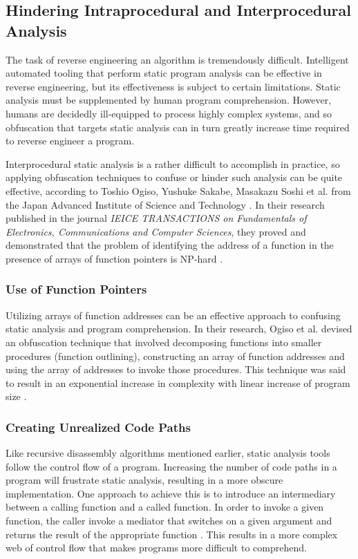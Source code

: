 \documentclass[conference]{IEEEtran}
\begin{document}
\subsection{Hindering Intraprocedural and Interprocedural Analysis}
The task of reverse engineering an algorithm is tremendously difficult. Intelligent automated tooling that perform static program analysis can be effective in reverse engineering, but its effectiveness is subject to certain limitations. Static analysis must be supplemented by human program comprehension. However, humans are decidedly ill-equipped to process highly complex systems, and so obfuscation that targets static analysis can in turn greatly increase time required to reverse engineer a program.

Interprocedural static analysis is a rather difficult to accomplish in practice, so applying obfuscation techniques to confuse or hinder such analysis can be quite effective, according to Toshio Ogiso, Yushuke Sakabe, Masakazu Soshi et al. from the Japan Advanced Institute of Science and Technology \cite{b4}. In their research published in the journal \textit{IEICE TRANSACTIONS on Fundamentals of Electronics, Communications and Computer Sciences}, they proved and demonstrated that the problem of identifying the address of a function in the presence of arrays of function pointers is NP-hard \cite{b4}.

\subsubsection{Use of Function Pointers}
Utilizing arrays of function addresses can be an effective approach to confusing static analysis and program comprehension. In their research, Ogiso et al. devised an obfuscation technique that involved decomposing functions into smaller procedures (function outlining), constructing an array of function addresses and using the array of addresses to invoke those procedures. This technique was said to result in an exponential increase in complexity with linear increase of program size \cite{b4}.

\subsubsection{Creating Unrealized Code Paths}
Like recursive disassembly algorithms mentioned earlier, static analysis tools follow the control flow of a program. Increasing the number of code paths in a program will frustrate static analysis, resulting in a more obscure implementation. One approach to achieve this is to introduce an intermediary between a calling function and a called function. In order to invoke a given function, the caller invoke a mediator that switches on a given argument and returns the result of the appropriate function \cite{b4}. This results in a more complex web of control flow that makes programs more difficult to comprehend.
\end{document}
